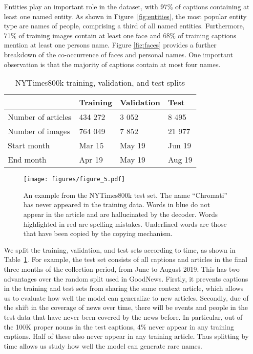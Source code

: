 Entities play an important role in the dataset, with 97\% of captions
containing at least one named entity. As shown in Figure~\ref{fig:entities},
the most popular entity type are names of people, comprising a third of all
named entities. Furthermore, 71\% of training images contain at least one face
and 68\% of training captions mention at least one persons name. Figure
\ref{fig:faces} provides a further breakdown of the co-occurrence of faces and
personal names. One important observation is that the majority of captions
contain at most four names.


\begin{table}[t]
	\caption {NYTimes800k training, validation, and test splits}
	\label{tab:splits}
	\centering
	\begin{tabularx}{\linewidth}{lXXX}
		\toprule
		  & Training  &   Validation & Test \\
		\midrule
      Number of articles & 434 272 & 3 052 & 8 495 \\
      Number of images  & 764 049 & 7 852 & 21 977 \\
      Start month & Mar 15 & May 19 & Jun 19 \\
      End month & Apr 19 & May 19 & Aug 19 \\
		\bottomrule
	\end{tabularx}
\end{table}

\begin{figure*}[t]
   \begin{center}
		\texttt{[image: figures/figure\_5.pdf]}
	\end{center}
   \caption{An example from the NYTimes800k test set. The name ``Chromati'' has
   never appeared in the training data. Words in blue do not appear in the
   article and are hallucinated by the decoder. Words highlighted in red are
   spelling mistakes. Underlined words are those that have been copied by the
   copying mechanism.}
   \label{fig:short}
\end{figure*}


We split the training, validation, and test sets according to time, as shown in
Table~\ref{tab:splits}. For example, the test set consists of all captions and
articles in the final three months of the collection period, from June to
August 2019. This has two advantages over the random split used in GoodNews.
Firstly, it prevents captions in the training and test sets from sharing the
same context article, which allows us to evaluate how well the model can
generalize to new articles. Secondly, due of the shift in the coverage of news
over time, there
will be events and people in the test data that have never been covered by the
news
before. In particular, out of the 100K proper nouns in the test captions, 4\%
never appear in any training captions. Half of these also never appear in any
training article. Thus splitting by time allows us study how well the model can
generate rare names.
